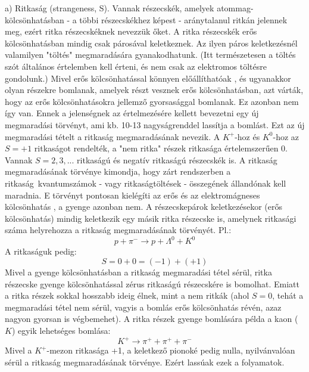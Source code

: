 \documentclass[../main.tex]{subfiles}
\begin{document}
a) Ritkaság (strangeness, S). Vannak részecskék, amelyek atommag-
kölcsönhatásban - a többi részecskékhez képest - aránytalanul ritkán jelennek meg, ezért ritka részecskéknek nevezzük őket. A ritka részecskék erős
kölcsönhatásban mindig csak párosával keletkeznek. Az ilyen páros keletkezésnél valamilyen "töltés" megmaradására gyanakodhatunk. (Itt természetesen a töltés szót általános értelemben kell érteni, és nem csak az elektromos
töltésre gondolunk.) Mivel erős kölcsönhatással könnyen előállíthatóak , és
ugyanakkor olyan részekre bomlanak, amelyek részt vesznek erős kölcsönhatásban, azt várták, hogy az erős kölcsönhatásokra jellemző gyorsasággal
bomlanak. Ez azonban nem így van. Ennek a jelenségnek az értelmezésére
kellett bevezetni egy új megmaradási törvényt, ami kb. 10-13 nagyságrenddel lassítja a bomlást. Ezt az új megmaradási tételt a ritkaság megmaradásának nevezik. A $K^+$-hoz és $K^0$-hoz az $S = +1$ ritkaságot rendelték, a
"nem ritka" részek ritkasága értelemszerűen $0$. Vannak $S = 2, 3, ...$ ritkaságú és negatív ritkaságú részecskék is. A ritkaság megmaradásának törvénye kimondja, hogy zárt rendszerben a ritkaság~kvantumszámok - vagy
ritkaságtöltések - összegének állandónak kell maradnia. E törvényt pontosan kielégíti az erős és az elektromágneses kölcsönhatás , a gyenge azonban
nem. A részecskepárok keletkezésekor (erős kölcsönhatás) mindig keletkezik egy másik ritka részecske is, amelynek ritkasági száma helyrehozza a
ritkaság megmaradásának törvényét. Pl.:
\begin{equation}
    p + \pi^- \rightarrow p + \Lambda^0 + K^0
\end{equation}
A ritkaságuk pedig:
\begin{equation}
    S = 0 + 0 = (-1) + (+1)
\end{equation}
Mivel a gyenge kölcsönhatásban a ritkaság megmaradási tétel sérül, ritka
részecske gyenge kölcsönhatással zérus ritkaságú részecskére is bomolhat.
Emiatt a ritka részek sokkal hosszabb ideig élnek, mint a nem ritkák (ahol
$S = 0$, tehát a megmaradási tétel nem sérül, vagyis a bomlás erős kölcsönhatás révén, azaz nagyon gyorsan is végbemehet). A ritka részek gyenge
bomlására példa a kaon ($K$) egyik lehetséges bomlása:
\begin{equation}
    K^+ \rightarrow \pi^+ + \pi^+ + \pi^-
\end{equation}
Mivel a $K^+$-mezon ritkasága +1, a keletkező pionoké pedig nulla, nyilvánvalóan sérül a ritkaság megmaradásának törvénye. Ezért lassúak ezek a folyamatok.
\end{document}
